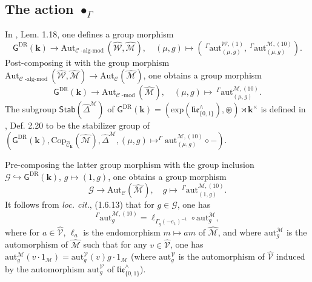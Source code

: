 \documentclass[10pt]{amsart}
\newcommand{\DR}{\mathrm{DR}}
\numberwithin{equation}{subsection}
\begin{document}
\subsection{The action $\bullet_\Gamma$}\label{sect:3:2}

In \cite{EF2}, Lem. 1.18, one defines a group morphism 
$$
\mathsf G^\DR(\mathbf k)\to 
\mathrm{Aut}_{\mathcal C\operatorname{-alg-mod}}(\hat{\mathcal W},\hat{\mathcal M}), \quad 
(\mu,g)\mapsto
(\ ^\Gamma\!\mathrm{aut}^{\mathcal W,(1)}_{(\mu,g)},\ ^\Gamma\!\mathrm{aut}^{\mathcal M,(10)}_{(\mu,g)}). 
$$
Post-composing it with the group morphism 
$\mathrm{Aut}_{\mathcal C\operatorname{-alg-mod}}(\hat{\mathcal W},\hat{\mathcal M})
\to \mathrm{Aut}_{\mathcal C}(\hat{\mathcal M})$, one obtains a group morphism 
$$
\mathsf G^\DR(\mathbf k)\to 
\mathrm{Aut}_{\mathcal C\operatorname{-mod}}(\hat{\mathcal M}), \quad 
(\mu,g)\mapsto
\ ^\Gamma\!\mathrm{aut}^{\mathcal M,(10)}_{(\mu,g)}. 
$$
The subgroup $\mathsf{Stab}(\hat\Delta^{\mathcal M})$ of $\mathsf G^\DR(\mathbf k)=(\mathrm{exp}(\mathfrak{lie}_{\{0,1\}}^\wedge),\circledast) 
\rtimes \mathbf k^\times$ is defined in \cite{EF2}, Def. 2.20 
to be the stabilizer group of $(\mathsf G^\DR(\mathbf k),\mathrm{Cop}_{\hat{\mathcal C}_{\mathbf k}}(\hat{\mathcal M}),\hat\Delta^{\mathcal M},
(\mu,g)\mapsto ^\Gamma\mathrm{aut}^{\mathcal M,(10)}_{(\mu,g)}\diamond-)$. 

Pre-composing the latter group morphism with the group inclusion $\mathcal G\hookrightarrow \mathsf G^\DR(\mathbf k)$, 
$g\mapsto (1,g)$, one obtains a group morphism 
\begin{equation}\label{def;mor:Gamma:2312:BIS}
\mathcal G\to \mathrm{Aut}_{\mathcal C}(\hat{\mathcal M}), 
\quad g\mapsto\ ^\Gamma\!\mathrm{aut}^{\mathcal M,(10)}_{(1,g)}.     
\end{equation}
It follows from {\it loc. cit.}, (1.6.13) that for $g\in\mathcal G$, one has 
\begin{equation}\label{id:1512:BIS}
 ^\Gamma\mathrm{aut}_g^{\mathcal M,(10)}
=\ell_{\Gamma_g(-e_1)^{-1}}\circ \mathrm{aut}_g^{\mathcal M},  
\end{equation}
where for $a\in\hat{\mathcal V}$, $\ell_a$ is the endomorphism $m\mapsto am$ of $\hat{\mathcal M}$, and where 
$\mathrm{aut}_g^{\mathcal M}$ is the automorphism of $\hat{\mathcal M}$ such that for any $v\in\hat{\mathcal V}$, 
one has $\mathrm{aut}_g^{\mathcal M}(v\cdot 1_{\mathcal M})=\mathrm{aut}_g^{\mathcal V}(v)g\cdot 1_{\mathcal M}$
(where $\mathrm{aut}_g^{\mathcal V}$ is the automorphism of $\hat{\mathcal V}$ induced by 
the automorphism $\mathrm{aut}_g^{\mathcal V}$ of $\mathfrak{lie}_{\{0,1\}}^\wedge$). 
\end{document}
